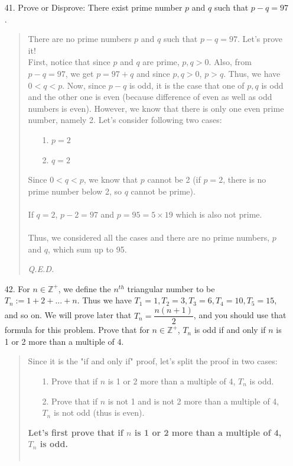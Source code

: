 \documentclass[12pt, a4paper]{article}                      %
\newcommand{\intzp}{\mathbb{Z^+}}
\begin{document}
\begin{itemize}
\item[41.]
Prove or Disprove: There exist prime number $p$ and $q$ such that $p - q = 97$.
\begin{quote}
There are no prime numbers $p$ and $q$ such that $p - q = 97$. Let's prove it!
\\
First, notice that since $p$ and $q$ are prime, $p,q > 0$. Also, from $p - q = 97$,
we get $p = 97 + q$ and since $p,q > 0$, $p > q$. Thus, we have $0 < q  < p$.
Now, since $p - q$ is odd, it is the case that one of $p,q$ is odd and the other one is even
(because difference of even as well as odd numbers is even). However, we know that there is only
one even prime number, namely 2. Let's consider following two cases:
\begin{itemize}
\item[1.]
$p = 2$
\item[2.]
$q = 2$
\end{itemize}
Since $0 < q < p$, we know that $p$ cannot be 2 (if $p = 2$,
there is no prime number below 2, so $q$ cannot be prime).
\\\\
If $q = 2$, $p - 2 = 97$ and $p = 95 = 5 \times 19$ which is also not prime.
\\\\
Thus, we considered all the cases and there are no prime numbers, $p$ and $q$,
which sum up to 95.
\begin{flushright}
\textit{Q.E.D.}
\end{flushright}
\end{quote}
\item[42.]
For $n \in \intzp$, we define the $n^{th}$ triangular number to be $T_n := 1 + 2 + ... + n$.
Thus we have $T_1 = 1, T_2 = 3, T_3 = 6, T_4 = 10, T_5 = 15$, and so on. We will prove later
that $T_n = \dfrac{n(n+1)}{2}$, and you should use that formula for this problem. Prove that
for $n \in \intzp$, $T_n$ is odd if and only if $n$ is 1 or 2 more than a multiple of $4$.
\begin{quote}
Since it is the "if and only if" proof, let's split the proof in two cases:
\begin{itemize}
\item[1.]
Prove that if $n$ is 1 or 2 more than a multiple of 4, $T_n$ is odd.
\item[2.]
Prove that if $n$ is not 1 and is not 2 more than a multiple of 4, $T_n$ is not odd (thus is even).
\end{itemize}
\textbf{Let's first prove that if $n$ is 1 or 2 more than a multiple of 4, $T_n$ is odd.}\\\\

\end{quote}
\end{itemize}
\end{document}
